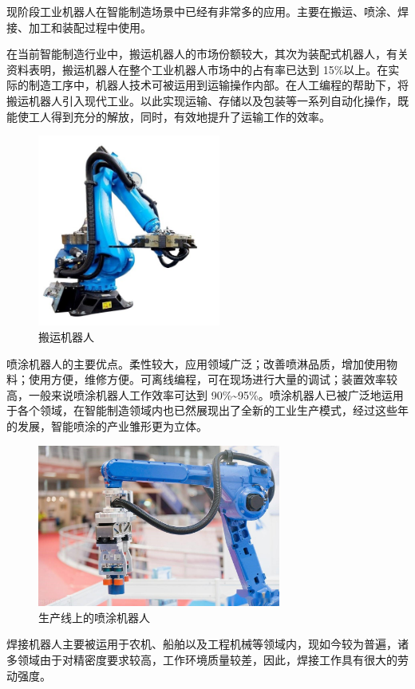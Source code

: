 \documentclass[lang=cn,12pt,bibtex,newtx,twoside,margintrue,citestyle=gb7714-2015, bibstyle=gb7714-2015]{elegantbook}
\begin{document}
现阶段工业机器人在智能制造场景中已经有非常多的应用。主要在搬运、喷涂、焊接、加工和装配过程中使用。

在当前智能制造行业中，搬运机器人的市场份额较大，其次为装配式机器人，有关资料表明，搬运机器人在整个工业机器人市场中的占有率已达到 15\%以上。在实际的制造工序中，机器人技术可被运用到运输操作内部。在人工编程的帮助下，将搬运机器人引入现代工业。以此实现运输、存储以及包装等一系列自动化操作，既能使工人得到充分的解放，同时，有效地提升了运输工作的效率。

\begin{figure}[htbp]
\centering
\includegraphics[angle=0,width=6cm]{./figure/2.8.jpg}
\caption{\label{2.8}搬运机器人}
\end{figure}

喷涂机器人的主要优点。柔性较大，应用领域广泛；改善喷淋品质，增加使用物料；使用方便，维修方便。可离线编程，可在现场进行大量的调试；装置效率较高，一般来说喷涂机器人工作效率可达到 90\%\textasciitilde{}95\%。喷涂机器人已被广泛地运用于各个领域，在智能制造领域内也已然展现出了全新的工业生产模式，经过这些年的发展，智能喷涂的产业雏形更为立体。

\begin{figure}[htbp]
\centering
\includegraphics[angle=0,width=8cm]{./figure/2.9.jpg}
\caption{\label{2.9}生产线上的喷涂机器人}
\end{figure}

焊接机器人主要被运用于农机、船舶以及工程机械等领域内，现如今较为普遍，诸多领域由于对精密度要求较高，工作环境质量较差，因此，焊接工作具有很大的劳动强度。
\end{document}
